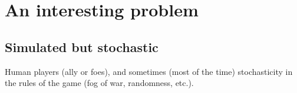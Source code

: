 
\section{An interesting problem}
\subsection{Simulated but stochastic}
Human players (ally or foes), and sometimes (most of the time) stochasticity in the rules of the game (fog of war, randomness, etc.).
